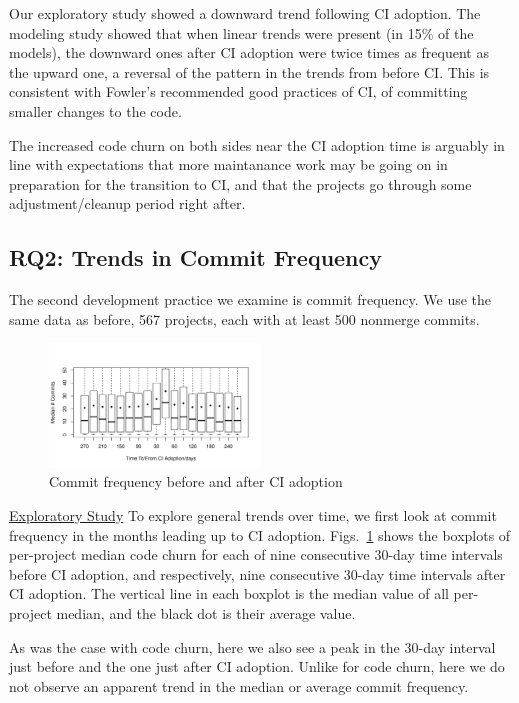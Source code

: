 Our exploratory study showed a downward trend following CI adoption.
The modeling study showed that when linear trends were present (in 15\% of the models), the downward ones after CI adoption were twice times as frequent as the upward one, a reversal of the pattern in the trends from before CI.
This is consistent with Fowler's recommended good practices of CI, of committing smaller changes to the code.

The increased code churn on both sides near the CI adoption time is arguably in line with expectations that more maintanance work may be going on in preparation for the transition to CI, and that the projects go through some adjustment/cleanup period right after.


\subsection{RQ2: Trends in Commit Frequency}

The second development practice we examine is commit frequency.
We use the same data as before, 567 projects, each with at least 500 nonmerge commits.

\begin{figure}[!t]
\centering
\includegraphics[width=0.5\textwidth]{numbercommits.pdf}
\caption{Commit frequency before and after CI adoption}
\label{Fig:NumberCommits}
\end{figure}

\noindent \underline{Exploratory Study} To explore general trends over time, we first look at commit frequency in the months leading up to CI adoption.
Figs.~\ref{Fig:NumberCommits} shows the boxplots of per-project median code churn for each of nine consecutive 30-day time intervals before CI adoption, and respectively, nine consecutive 30-day time intervals after CI adoption.
The vertical line in each boxplot is the median value of all per-project median, and the black dot is their average value.

As was the case with code churn, here we also see a peak in the 30-day interval just before and the one just after CI adoption.
Unlike for code churn, here we do not observe an apparent trend in the median or average commit frequency.

